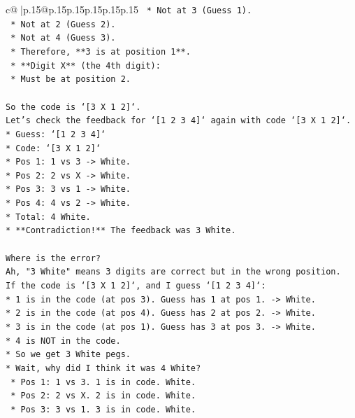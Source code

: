 \documentclass{article}
\begin{document}
{\begin{supertabular}{c@{$\;$}|p{.15\linewidth}@{}p{.15\linewidth}p{.15\linewidth}p{.15\linewidth}p{.15\linewidth}p{.15\linewidth}}
{{{\texttt{        *   Not at 3 (Guess 1).} \\
\texttt{        *   Not at 2 (Guess 2).} \\
\texttt{        *   Not at 4 (Guess 3).} \\
\texttt{        *   Therefore, **3 is at position 1**.} \\
\texttt{    *   **Digit X** (the 4th digit):} \\
\texttt{        *   Must be at position 2.} \\
\\ 
\texttt{So the code is `{[}3 X 1 2{]}`.} \\
\texttt{Let's check the feedback for `{[}1 2 3 4{]}` again with code `{[}3 X 1 2{]}`.} \\
\texttt{*   Guess: `{[}1 2 3 4{]}`} \\
\texttt{*   Code: `{[}3 X 1 2{]}`} \\
\texttt{*   Pos 1: 1 vs 3 {-}> White.} \\
\texttt{*   Pos 2: 2 vs X {-}> White.} \\
\texttt{*   Pos 3: 3 vs 1 {-}> White.} \\
\texttt{*   Pos 4: 4 vs 2 {-}> White.} \\
\texttt{*   Total: 4 White.} \\
\texttt{*   **Contradiction!** The feedback was 3 White.} \\
\\ 
\texttt{Where is the error?} \\
\texttt{Ah, "3 White" means 3 digits are correct but in the wrong position.} \\
\texttt{If the code is `{[}3 X 1 2{]}`, and I guess `{[}1 2 3 4{]}`:} \\
\texttt{*   1 is in the code (at pos 3). Guess has 1 at pos 1. {-}> White.} \\
\texttt{*   2 is in the code (at pos 4). Guess has 2 at pos 2. {-}> White.} \\
\texttt{*   3 is in the code (at pos 1). Guess has 3 at pos 3. {-}> White.} \\
\texttt{*   4 is NOT in the code.} \\
\texttt{*   So we get 3 White pegs.} \\
\texttt{*   Wait, why did I think it was 4 White?} \\
\texttt{    *   Pos 1: 1 vs 3. 1 is in code. White.} \\
\texttt{    *   Pos 2: 2 vs X. 2 is in code. White.} \\
\texttt{    *   Pos 3: 3 vs 1. 3 is in code. White.} \\
}}}
\end{supertabular}}
\end{document}
